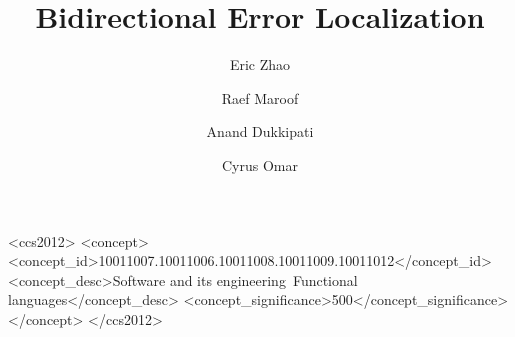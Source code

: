 \documentclass[acmsmall, screen]{acmart}
\begin{document}
\title{Bidirectional Error Localization}

\author{Eric Zhao}

\author{Raef Maroof}

\author{Anand Dukkipati}

\author{Cyrus Omar}



\begin{CCSXML}
<ccs2012>
  <concept>
    <concept_id>10011007.10011006.10011008.10011009.10011012</concept_id>
    <concept_desc>Software and its engineering~Functional languages</concept_desc>
    <concept_significance>500</concept_significance>
  </concept>
</ccs2012>
\end{CCSXML}



\maketitle









\end{document}
